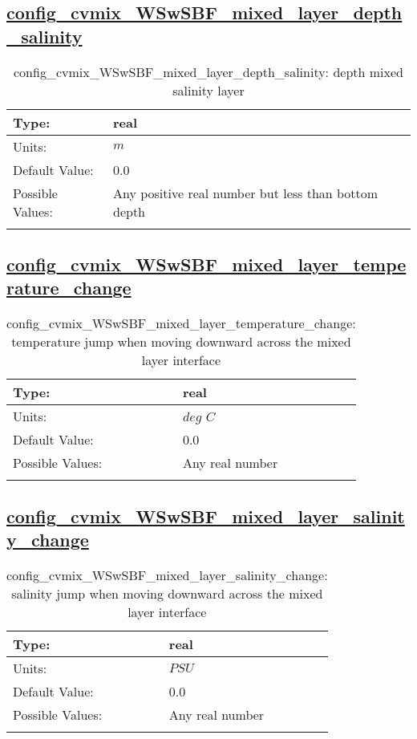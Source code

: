 \subsection[config\_cvmix\_WSwSBF\_mixed\_layer\_depth\_salinity]{\hyperref[sec:nm_tab_cvmix_WSwSBF]{config\_cvmix\_WSwSBF\_mixed\_layer\_depth\_salinity}}
\label{subsec:nm_sec_config_cvmix_WSwSBF_mixed_layer_depth_salinity}
\begin{center}
\begin{longtable}{| p{2.0in} || p{4.0in} |}
    \hline
    Type: & real \\
    \hline
    Units: & $m$ \\
    \hline
    Default Value: & 0.0 \\
    \hline
    Possible Values: & Any positive real number but less than bottom depth \\
    \hline
    \caption{config\_cvmix\_WSwSBF\_mixed\_layer\_depth\_salinity: depth mixed salinity layer}
\end{longtable}
\end{center}
\subsection[config\_cvmix\_WSwSBF\_mixed\_layer\_temperature\_change]{\hyperref[sec:nm_tab_cvmix_WSwSBF]{config\_cvmix\_WSwSBF\_mixed\_layer\_temperature\_change}}
\label{subsec:nm_sec_config_cvmix_WSwSBF_mixed_layer_temperature_change}
\begin{center}
\begin{longtable}{| p{2.0in} || p{4.0in} |}
    \hline
    Type: & real \\
    \hline
    Units: & $deg$ $C$ \\
    \hline
    Default Value: & 0.0 \\
    \hline
    Possible Values: & Any real number \\
    \hline
    \caption{config\_cvmix\_WSwSBF\_mixed\_layer\_temperature\_change: temperature jump when moving downward across the mixed layer interface}
\end{longtable}
\end{center}
\subsection[config\_cvmix\_WSwSBF\_mixed\_layer\_salinity\_change]{\hyperref[sec:nm_tab_cvmix_WSwSBF]{config\_cvmix\_WSwSBF\_mixed\_layer\_salinity\_change}}
\label{subsec:nm_sec_config_cvmix_WSwSBF_mixed_layer_salinity_change}
\begin{center}
\begin{longtable}{| p{2.0in} || p{4.0in} |}
    \hline
    Type: & real \\
    \hline
    Units: & $PSU$ \\
    \hline
    Default Value: & 0.0 \\
    \hline
    Possible Values: & Any real number \\
    \hline
    \caption{config\_cvmix\_WSwSBF\_mixed\_layer\_salinity\_change: salinity jump when moving downward across the mixed layer interface}
\end{longtable}
\end{center}
